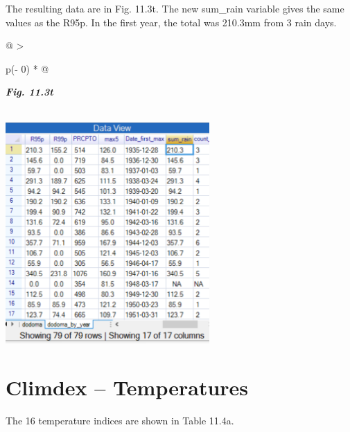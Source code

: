 \documentclass[
  letterpaper,
  DIV=11,
  numbers=noendperiod]{scrreprt}
\begin{document}
The resulting data are in Fig. 11.3t. The new sum\_rain variable gives
the same values as the R95p. In the first year, the total was 210.3mm
from 3 rain days.

\begin{longtable}[]{@{}
  >{\raggedright\arraybackslash}p{(\columnwidth - 0\tabcolsep) * }@{}}
\toprule\noalign{}
\begin{minipage}[b]{\linewidth}\raggedright
\textbf{\emph{Fig. 11.3t}}
\end{minipage} \\
\midrule\noalign{}
\endhead
\bottomrule\noalign{}
\endlastfoot
\includegraphics[width=3.06752in,height=3.32573in]{figures/Fig11.3t.png} \\
\end{longtable}

\section{Climdex -- Temperatures}\label{climdex-temperatures}

The 16 temperature indices are shown in Table 11.4a.
\end{document}
